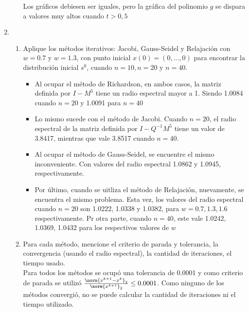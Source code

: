 \documentclass{udpreport}
\begin{document}
\begin{enumerate}
\begin{enumerate}
Los gráficos debiesen ser iguales, pero la gráfica del polinomio $g$ se dispara a valores muy altos cuando $t>0,5$

     \end{enumerate}

 	\item 
 	\begin{enumerate}
 			\item Aplique los métodos iterativos: Jacobi, Gauss-Seidel y Relajación con $w = 0.7$ y $w = 1.3$, con punto inicial $x(0) = (0, . . . , 0)$ para encontrar la distribución inicial $s^0$, cuando $n = 10, n = 20$ y $n = 40$.
 			\begin{itemize}
 				\item Al ocupar el método de Richardson, en ambos casos, la matriz definida por $I-M^5$ tiene un radio espectral mayor a 1. Siendo 1.0084 cuando $n=20$ y 1.0091 para $n=40$
 				\item Lo mismo sucede con el método de Jacobi. Cuando $n = 20$, el radio espectral de la matriz definida por $I-Q^{-1}M^5$ tiene un valor de 3.8417, mientras que vale 3.8517 cuando  $n=40$.
 				\item Al ocupar el método de Gauss-Seidel, se encuentre el mismo inconveniente. Con valores del radio espectral 1.0862 y 1.0945, respectivamente.
 				\item Por último, cuando se uitliza el método de Relajación, nuevamente, se encuentra el mismo problema. Esta vez, los valores del radio espectral cuando $n=20$ son 1.0222, 1.0338 y 1.0382, para $w=0.7, 1.3,1.6$ respectivamente. Pr otra parte, cuando $n=40$, este vale 1.0242, 1.0369, 1.0432 para los respectivos valores de $w$
 			\end{itemize}
 			\newpage
 			\item Para cada método, mencione el criterio de parada y tolerancia, la convergencia (usando el radio espectral), la cantidad de iteraciones, el tiempo usado.\\
 			Para todos los métodos se ocupó una tolerancia de 0.0001 y como criterio de parada se utilizó $\frac{\norm{x^{k+1}-x^{k}}_{2}}{\norm{x^{k+1}}_{2}}\leq 0.0001$. 
 			Como ninguno de los métodos convergió, no se puede calcular la cantidad de iteraciones ni el tiempo utilizado.
 			
		\end{enumerate} 	  


\end{enumerate}
\end{document}
